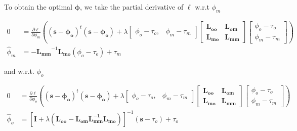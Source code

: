         To obtain the optimal $\mathbf{\phi}$, we take the partial
        derivative of $\ell$ w.r.t $\phi_m$

        \begin{align}
            0 &= \frac{\partial\ell}{\partial\phi_m}\left((\mathbf{s} - \mathbf{\phi_o})^t(\mathbf{s} - \mathbf{\phi_o}) + \lambda
                \begin{bmatrix}
                    \phi_o - \tau_o, & \phi_m - \tau_m
                \end{bmatrix}
                \begin{bmatrix}
                    \mathbf{L_{oo}} & \mathbf{L_{om}} \\ \mathbf{L_{mo}} & \mathbf{L_{mm}}
                \end{bmatrix}
                \begin{bmatrix}
                    \phi_o - \tau_o \\ \phi_m - \tau_m
                \end{bmatrix}\right)\\
            {\hat \phi_m} &= -\mathbf{L_{mm}}^{-1}\mathbf{L_{mo}}(\phi_o - \tau_o) + \tau_m
            \label{eqn:estimate_of_phi_m}
        \end{align}

        \noindent and w.r.t. $\phi_o$

        \begin{align}
            0 &= \frac{\partial\ell}{\partial\phi_o}\left((\mathbf{s} - \mathbf{\phi_o}
                )^t(\mathbf{s} - \mathbf{\phi_o}) + \lambda
                \begin{bmatrix}
                    \phi_o - \tau_o, & \phi_m - \tau_m
                \end{bmatrix}
                \begin{bmatrix}
                    \mathbf{L_{oo}} & \mathbf{L_{om}} \\ \mathbf{L_{mo}} & \mathbf{L_{mm}}
                \end{bmatrix}
                \begin{bmatrix}
                    \phi_o - \tau_o \\ \phi_m - \tau_m
                \end{bmatrix}\right)\\
            {\hat \phi_o} &= \left[
                \mathbf{I} + \lambda\left(\mathbf{L_{oo}} -
                    \mathbf{L_{om}}\mathbf{L_{mm}^{-1}}\mathbf{L_{mo}}
                \right)
            \right]^{-1}(\mathbf{s} - \tau_o) + \tau_o
            \label{eqn:estimate_of_phi_o}
        \end{align}


